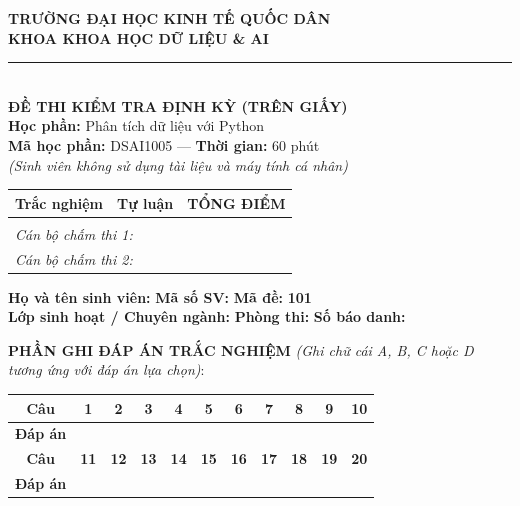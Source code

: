 \documentclass[11pt,a4paper]{article}
\begin{document}
\noindent
\begin{minipage}[t]{0.52\textwidth}
  \centering
  \textbf{TRƯỜNG ĐẠI HỌC KINH TẾ QUỐC DÂN}\\
  \textbf{KHOA KHOA HỌC DỮ LIỆU \& AI}\\
  \rule{4cm}{0.4pt}\\[1.5mm]
  \textbf{ĐỀ THI KIỂM TRA ĐỊNH KỲ (TRÊN GIẤY)}\\
  \textbf{Học phần:} Phân tích dữ liệu với Python\\
  \textbf{Mã học phần:} DSAI1005 --- \textbf{Thời gian:} 60 phút\\
  \textit{\small (Sinh viên không sử dụng tài liệu và máy tính cá nhân)}
\end{minipage}
\hfill
\begin{minipage}[t]{0.45\textwidth}
  \begin{tabular}{|p{2.3cm}|p{2.3cm}|p{2.3cm}|}
    \hline
    \centering \textbf{Trắc nghiệm} & \centering \textbf{Tự luận} & \centering \textbf{TỔNG ĐIỂM} \tabularnewline
    \hline
    & & \\[0.8cm]
    \hline
    \multicolumn{3}{|l|}{\small \textit{Cán bộ chấm thi 1:}} \tabularnewline
    \multicolumn{3}{|l|}{\small \textit{Cán bộ chấm thi 2:}} \tabularnewline
    \hline
  \end{tabular}
\end{minipage}

\vspace{2mm}
\noindent
\textbf{Họ và tên sinh viên:} \dotfill{} \textbf{Mã số SV:} \dotfill{} \textbf{Mã đề:} \textbf{101}\\
\textbf{Lớp sinh hoạt / Chuyên ngành:} \dotfill{} \textbf{Phòng thi:} \dotfill{} \textbf{Số báo danh:} \dotfill

\vspace{2mm}
\noindent
\textbf{PHẦN GHI ĐÁP ÁN TRẮC NGHIỆM} \textit{(Ghi chữ cái A, B, C hoặc D tương ứng với đáp án lựa chọn)}:
\begin{center}
\begin{tabular}{|c|c|c|c|c|c|c|c|c|c|c|}
  \hline
  \textbf{Câu} & \textbf{1} & \textbf{2} & \textbf{3} & \textbf{4} & \textbf{5} & \textbf{6} & \textbf{7} & \textbf{8} & \textbf{9} & \textbf{10} \\
  \hline
  \textbf{Đáp án} & & & & & & & & & & \\[3mm]
  \hline
  \hline
  \textbf{Câu} & \textbf{11} & \textbf{12} & \textbf{13} & \textbf{14} & \textbf{15} & \textbf{16} & \textbf{17} & \textbf{18} & \textbf{19} & \textbf{20} \\
  \hline
  \textbf{Đáp án} & & & & & & & & & & \\[3mm]
  \hline
\end{tabular}
\end{center}
\end{document}
